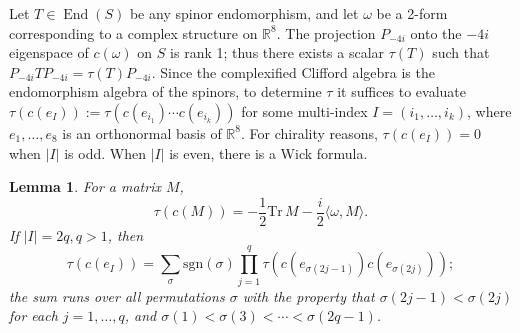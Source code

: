 \documentclass{article}
\newcommand{\real}{\mathbb{R}}
\DeclareMathOperator\End{End}
\newtheorem{lemma}[theorem]{Lemma}
\theoremstyle{definition}
\theoremstyle{remark}
\begin{document}
Let $T \in \End(S)$ be any spinor endomorphism, and let $\omega$ be a 2-form corresponding to a complex structure on $\real^8$.
The projection $P_{-4i}$ onto the $-4i$ eigenspace of $c(\omega)$ on $S$ is rank 1; thus there exists a scalar $\tau(T)$ such that $P_{-4i} T P_{-4i} = \tau(T) P_{-4i}$.
Since the complexified Clifford algebra is the endomorphism algebra of the spinors, to determine $\tau$ it suffices to evaluate $\tau(c(e_I)) := \tau(c(e_{i_1}) \cdots c(e_{i_k}))$ for some multi-index $I = (i_1, \ldots, i_k)$, where $e_1, \ldots, e_8$ is an orthonormal basis of $\real^8$.
For chirality reasons, $\tau(c(e_I)) = 0$ when $|I|$ is odd.
When $|I|$ is even, there is a Wick formula.
\begin{lemma}
    For a matrix $M$,
    \[
        \tau(c(M)) = -\frac{1}{2} \mathrm{Tr}\,M - \frac{i}{2} \langle \omega, M \rangle.
    \]
    If $|I| = 2q, q > 1$, then
    \begin{equation}
        \label{eq:pfaff}
        \tau(c(e_I)) = \sum_\sigma \mathrm{sgn}(\sigma) \prod_{j=1}^q \tau(c(e_{\sigma(2j-1)}) c(e_{\sigma(2j)}));
    \end{equation}
    the sum runs over all permutations $\sigma$ with the property that $\sigma(2j-1) < \sigma(2j)$ for each $j = 1, \ldots, q$, and $\sigma(1) < \sigma(3) < \cdots < \sigma(2q-1)$.
\end{lemma}
\end{document}
